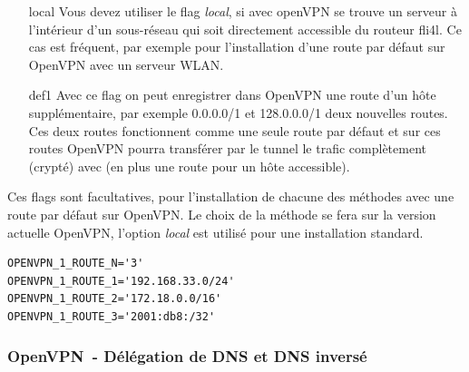 \begin{description}
\begin{itemize}
\item [local] Vous devez utiliser le flag \emph{local}, si avec openVPN se trouve
              un serveur à l'intérieur d'un sous-réseau qui soit directement
              accessible du routeur fli4l. Ce cas est fréquent, par exemple pour
              l'installation d'une route par défaut sur OpenVPN avec un serveur WLAN.
              
\item [def1] Avec ce flag on peut enregistrer dans OpenVPN une route d'un hôte
             supplémentaire, par exemple 0.0.0.0/1 et 128.0.0.0/1 deux nouvelles
             routes. Ces deux routes fonctionnent comme une seule route par défaut
             et sur ces routes OpenVPN pourra transférer par le tunnel le trafic
             complètement (crypté) avec (en plus une route pour un hôte accessible).
\end{itemize}

  Ces flags sont facultatives, pour l'installation de chacune des méthodes avec
  une route par défaut sur OpenVPN. Le choix de la méthode se fera sur la version
  actuelle OpenVPN, l'option \emph{local} est utilisé pour une installation standard.

\begin{example}
\begin{verbatim}
OPENVPN_1_ROUTE_N='3'
OPENVPN_1_ROUTE_1='192.168.33.0/24'
OPENVPN_1_ROUTE_2='172.18.0.0/16'
OPENVPN_1_ROUTE_3='2001:db8:/32'
\end{verbatim}
\end{example}

\end{description}


\subsubsection{OpenVPN~- Délégation de DNS et DNS inversé}

